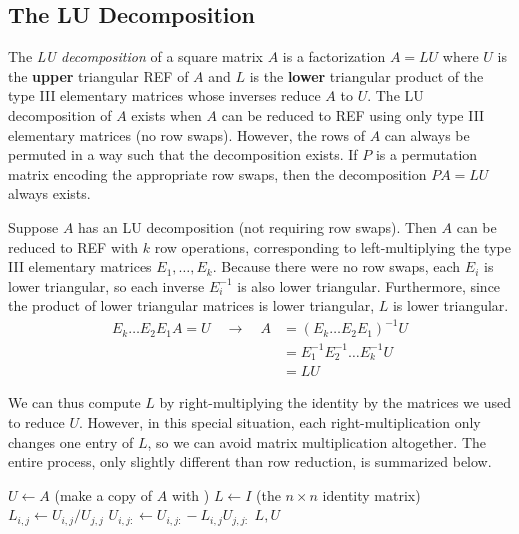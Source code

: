 \subsection*{The LU Decomposition} %

The \emph{LU decomposition} of a square matrix $A$ is a factorization $A=LU$ where $U$ is the \textbf{upper} triangular REF of $A$ and $L$ is the \textbf{lower} triangular product of the type III elementary matrices whose inverses reduce $A$ to $U$.
The LU decomposition of $A$ exists when $A$ can be reduced to REF using only type III elementary matrices (no row swaps).
However, the rows of $A$ can always be permuted in a way such that the decomposition exists.
If $P$ is a permutation matrix encoding the appropriate row swaps, then the decomposition $PA = LU$ always exists.

Suppose $A$ has an LU decomposition (not requiring row swaps).
Then $A$ can be reduced to REF with $k$ row operations, corresponding to left-multiplying the type III elementary matrices $E_1, \ldots, E_k$.
Because there were no row swaps, each $E_i$ is lower triangular, so each inverse $E_i^{-1}$ is also lower triangular.
Furthermore, since the product of lower triangular matrices is lower triangular, $L$ is lower triangular.
%
\begin{align*}
E_k\ldots E_2E_1 A = U\quad \longrightarrow\quad A &= (E_k \ldots E_2E_1)^{-1} U \\
&= E_1^{-1}E_2^{-1}\ldots E_k^{-1}U \\
&= LU
\end{align*}

We can thus compute $L$ by right-multiplying the identity by the matrices we used to reduce $U$.
However, in this special situation, each right-multiplication only changes one entry of $L$, so we can avoid matrix multiplication altogether.
The entire process, only slightly different than row reduction, is summarized below. %
%
\begin{algorithm}[H]
\begin{algorithmic}[1]
\State $U \gets A$ (make a copy of $A$ with )
\State $L \gets I$ (the $n\times n$ identity matrix)
        \State $L_{i,j} \gets U_{i, j}/U_{j, j}$
        \State $U_{i,j:} \gets U_{i,j:} - L_{i,j}U_{j,j:}$
    \EndFor
\EndFor
\State {} $L, U$
\EndProcedure
\end{algorithmic}
\caption{}
\label{alg:LU-Decomposition}
\end{algorithm}

